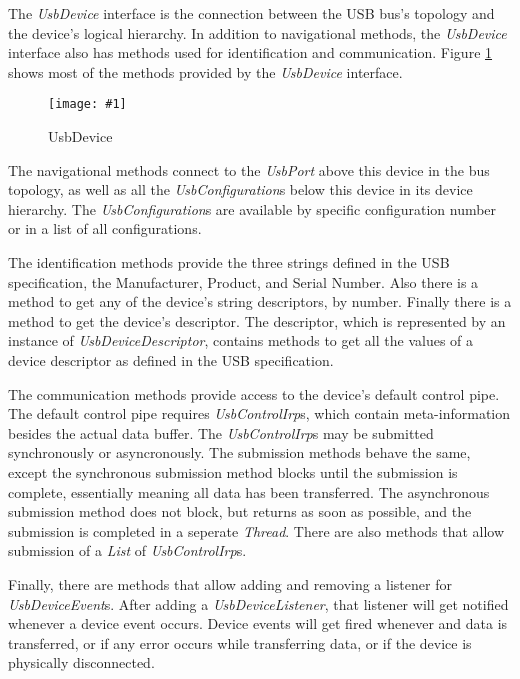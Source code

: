 \documentclass{article}
\newcommand{\myclass}[1]{\emph{#1}}
\newcommand{\myinterface}[1]{\emph{#1}}
\newcommand{\mysectionend}[0]{\vfill\pagebreak[1]}
\newcommand{\myfigure}[3]{\begin{figure}[htbp]\centering\texttt{[image: \#1]}\caption{#2}\label{#3}\end{figure}}
\begin{document}
The \myinterface{UsbDevice} interface is the connection between the USB bus's
topology and the device's logical hierarchy.  In addition to
navigational methods, the \myinterface{UsbDevice} interface also has methods
used for identification and communication.  Figure \ref{UsbDevice}
shows most of the methods provided by the \myinterface{UsbDevice} interface.

\myfigure{figs/UsbDevice}{UsbDevice}{UsbDevice}

The navigational methods connect to the \myinterface{UsbPort} above this
device in the bus topology, as well as all the \myinterface{UsbConfiguration}s
below this device in its device hierarchy.  The \myinterface{UsbConfiguration}s
are available by specific configuration number or in a list of
all configurations.

The identification methods provide the three strings defined in
the USB specification, the Manufacturer, Product, and Serial Number.
Also there is a method to get any of the device's string descriptors,
by number.  Finally there is a method to get the device's descriptor.
The descriptor, which is represented by an instance of \myinterface{UsbDeviceDescriptor},
contains methods to get all the values of a device descriptor as
defined in the USB specification.

The communication methods provide access to the device's default control
pipe.  The default control pipe requires \myinterface{UsbControlIrp}s, which contain
meta-information besides the actual data buffer.  The \myinterface{UsbControlIrp}s
may be submitted synchronously or asyncronously.  The submission methods
behave the same, except the synchronous submission method blocks until
the submission is complete, essentially meaning all data has been transferred.
The asynchronous submission method does not block, but returns as soon as
possible, and the submission is completed in a seperate \myclass{Thread}.  There
are also methods that allow submission of a \myinterface{List} of \myinterface{UsbControlIrp}s.

Finally, there are methods that allow adding and removing a listener for
\myclass{UsbDeviceEvent}s.  After adding a \myinterface{UsbDeviceListener}, that listener will
get notified whenever a device event occurs.  Device events will get
fired whenever and data is transferred, or if any error occurs while
transferring data, or if the device is physically disconnected.

\mysectionend

\end{document}
